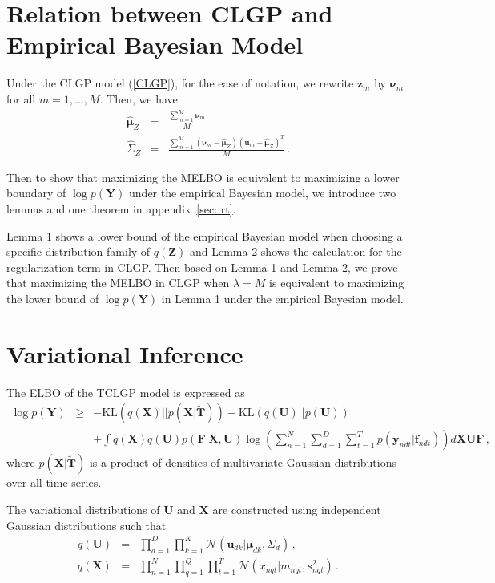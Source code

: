 \documentclass{article}
\begin{document}
\section{Relation between CLGP and Empirical Bayesian Model}
Under the CLGP model (\ref{CLGP}), for the ease of notation, we rewrite $\bm z_m$ by $\bm \nu_m$ for all $m = 1, \ldots, M$. Then, we have
\begin{eqnarray}
\hat{\bm \mu}_Z & = & \frac{\sum_{m = 1}^{M}\bm \nu_m}{M} \nonumber \\
\hat{\Sigma}_Z & = & \frac{\sum_{m = 1}^{M}(\bm \nu_m - \hat{\bm \mu}_Z)(\bm u_m - \hat{\bm \mu}_Z)^T}{M}\,. \nonumber
\end{eqnarray}

Then to show that maximizing the MELBO is equivalent to maximizing a lower boundary of $\log p(\bm Y)$ under the empirical Bayesian model, we introduce two lemmas and one theorem in appendix~\ref{sec: rt}. 

Lemma 1 shows a lower bound of the empirical Bayesian model when choosing a specific distribution family of $q(\bm Z)$ and Lemma 2 shows the calculation for the regularization term in CLGP. Then based on Lemma 1 and Lemma 2, we prove that maximizing the MELBO in CLGP when $\lambda = M$ is equivalent to maximizing the lower bound of $\log p(\bm Y)$ in Lemma 1 under the empirical Bayesian model.



\section{Variational Inference}

The ELBO of the TCLGP model is expressed as 
\begin{eqnarray}
\log p(\bm Y) & \geq & -\mathrm{KL}(q(\bm X) || p(\bm X | \tilde{\bm T})) - \mathrm{KL}(q(\bm U) || p(\bm U)) \\ 
& & +  \int q(\bm X) q(\bm  U) p(\bm F | \bm X, \bm U) \log\left(\sum_{n = 1}^{N}\sum_{d = 1}^{D}\sum_{t = 1}^{T} p(\bm y_{ndt} | \bm f_{ndt})\right)d\bm X \bm U \bm F\,, \nonumber
\end{eqnarray}
where $p(\bm X|\tilde{\bm T})$ is a product of densities of multivariate Gaussian distributions over all time series.

The variational distributions of $\bm U$ and $\bm X$ are constructed using independent Gaussian distributions such that
\begin{eqnarray}
q(\bm U) & = & \prod_{d = 1}^{D}\prod_{k = 1}^{K}\mathcal{N}(\bm u_{dk}| \bm{\mu}_{dk}, \Sigma_d)\,, \nonumber \\
q(\bm X) & = & \prod_{n = 1}^{N}\prod_{q = 1}^{Q}\prod_{t = 1}^{T} \mathcal{N}(x_{nqt}| m_{nqt}, s_{nqt}^2)\,. \nonumber
\end{eqnarray}
\end{document}
